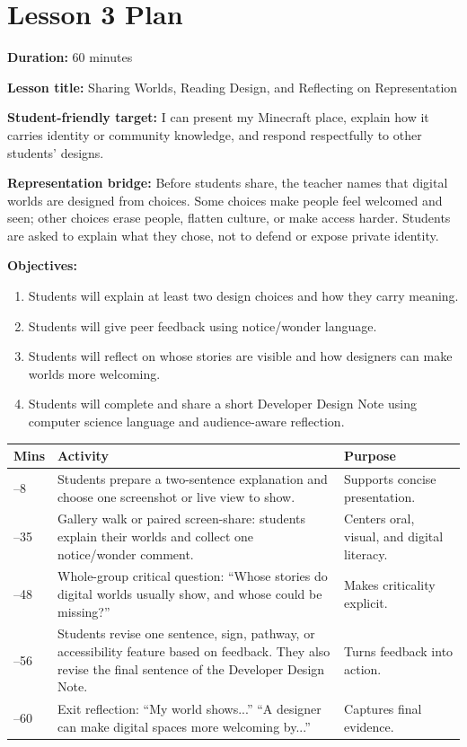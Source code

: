 \newpage
\section*{Lesson 3 Plan}

\textbf{Duration:} 60 minutes

\textbf{Lesson title:} Sharing Worlds, Reading Design, and Reflecting on Representation

\textbf{Student-friendly target:} I can present my Minecraft place, explain how it carries identity or community knowledge, and respond respectfully to other students' designs.

\textcolor{LessonTwoAccent}{\textbf{Representation bridge:} Before students share, the teacher names that digital worlds are designed from choices. Some choices make people feel welcomed and seen; other choices erase people, flatten culture, or make access harder. Students are asked to explain what they chose, not to defend or expose private identity.}

\textbf{Objectives:}
\begin{enumerate}[leftmargin=*]
    \item Students will explain at least two design choices and how they carry meaning.
    \item Students will give peer feedback using notice/wonder language.
    \item Students will reflect on whose stories are visible and how designers can make worlds more welcoming.
    \item \textcolor{LessonTwoAccent}{Students will complete and share a short Developer Design Note using computer science language and audience-aware reflection.}
\end{enumerate}

\renewcommand{\arraystretch}{0.85}
\setlength{\tabcolsep}{3pt}
\begin{tabularx}{\textwidth}{|>{\raggedright\arraybackslash}p{}|Y|>{\raggedright\arraybackslash}p{0.25\textwidth}|}
\hline
{}
\textbf{Mins} & \textbf{Activity} & \textbf{Purpose} \\ --8 & Students prepare a two-sentence explanation and choose one screenshot or live view to show. & Supports concise presentation. \\ --35 & Gallery walk or paired screen-share: students explain their worlds and collect one notice/wonder comment. & Centers oral, visual, and digital literacy. \\ --48 & Whole-group critical question: ``Whose stories do digital worlds usually show, and whose could be missing?'' & Makes criticality explicit. \\ --56 & Students revise one sentence, sign, pathway, or accessibility feature based on feedback. \textcolor{LessonTwoAccent}{They also revise the final sentence of the Developer Design Note.} & Turns feedback into action. \\ --60 & Exit reflection: ``My world shows...'' ``A designer can make digital spaces more welcoming by...'' & Captures final evidence. \\ \hline
\end{tabularx}

